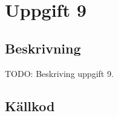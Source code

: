 \section{Uppgift 9}\label{uppgift-9}

\subsection{Beskrivning}
TODO: Beskriving uppgift 9.

\subsection{Källkod}\label{uppgift-9_src}
\inputminted[]{java}{../src/Lab1Uppg09.java}
